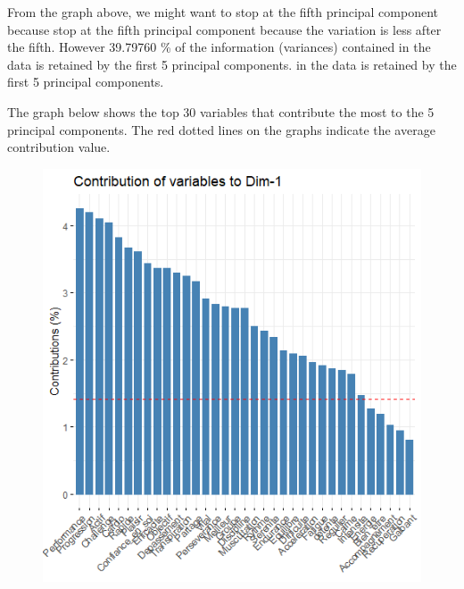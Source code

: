 \documentclass[12pt]{article}
\begin{document}
From the graph above, we might want to stop at the fifth principal component because 
stop at the fifth principal component because the variation is less after the fifth.
However 39.79760 \% of the information (variances) contained in the data is retained by the first 5 principal components.
in the data is retained by the first 5 principal components.


The graph below shows the top 30 variables that contribute the most to the 5 principal components. 
The red dotted lines on the graphs indicate the average contribution value.
 

\begin{figure}[H]
\begin{center}
\includegraphics[scale=1.3]{ACP_2.png} 
\caption[]{\ }
\end{center}
\end{figure}
\end{document}
